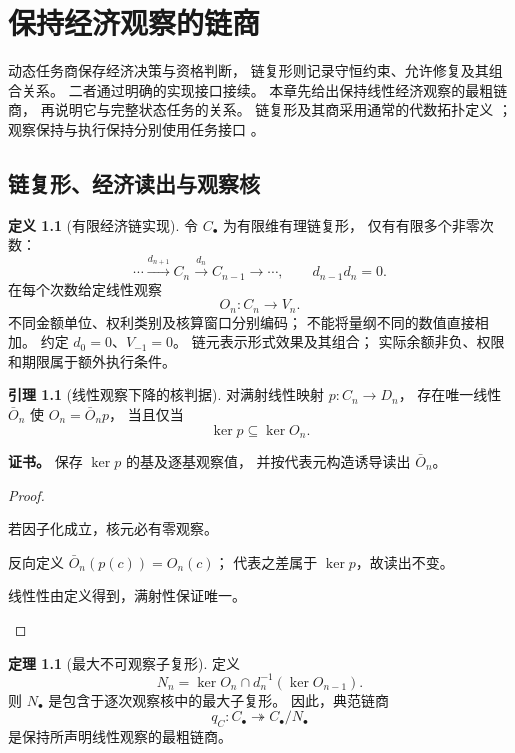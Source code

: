 \documentclass[UTF8,12pt,a4paper,openany,fontset=none,zihao=false]{ctexrep}
\theoremstyle{definition}
\newtheorem{definition}{定义}[chapter]
\newtheorem{theorem}{定理}[chapter]
\newtheorem{lemma}{引理}[chapter]
\newenvironment{certificate}{\par\noindent\textbf{证书。}\ignorespaces}{\par}
\newcommand{\1}{\mathbf 1}
\begin{document}
\chapter{保持经济观察的链商}
\label{ch:chapter}

动态任务商保存经济决策与资格判断，
链复形则记录守恒约束、允许修复及其组合关系。
二者通过明确的实现接口接续。
本章先给出保持线性经济观察的最粗链商，
再说明它与完整状态任务的关系。
链复形及其商采用通常的代数拓扑定义
\cite{Hatcher2002}；
观察保持与执行保持分别使用任务接口
\cite{InternalTheory,InternalEconomics}。
\section{链复形、经济读出与观察核}
\begin{definition}[有限经济链实现]
\label{ch:complex}
令 \(C_\bullet\) 为有限维有理链复形，
仅有有限多个非零次数：
\[
\cdots\xrightarrow{d_{n+1}}C_n
\xrightarrow{d_n}C_{n-1}\xrightarrow{}\cdots,
\qquad d_{n-1}d_n=0.
\]
在每个次数给定线性观察
\[
O_n:C_n\to V_n.
\]
不同金额单位、权利类别及核算窗口分别编码；
不能将量纲不同的数值直接相加。
约定 \(d_0=0\)、\(V_{-1}=0\)。
链元表示形式效果及其组合；
实际余额非负、权限和期限属于额外执行条件。
\end{definition}
\begin{lemma}[线性观察下降的核判据]
\label{ch:factor}
对满射线性映射 \(p:C_n\to D_n\)，
存在唯一线性 \(\bar O_n\) 使 \(O_n=\bar O_np\)，
当且仅当
\[
\ker p\subseteq\ker O_n.
\]
\end{lemma}
\begin{certificate}
保存 \(\ker p\) 的基及逐基观察值，
并按代表元构造诱导读出 \(\bar O_n\)。
\end{certificate}
\begin{proof}
\begin{semanticsteps}
\item 若因子化成立，核元必有零观察。
\item 反向定义 \(\bar O_n(p(c))=O_n(c)\)；
代表之差属于 \(\ker p\)，故读出不变。
\item 线性性由定义得到，满射性保证唯一。
\end{semanticsteps}
\end{proof}
\begin{theorem}[最大不可观察子复形]
\label{ch:maximal-kernel}
定义
\[
\boxed{
N_n=\ker O_n\cap d_n^{-1}(\ker O_{n-1}).
}
\]
则 \(N_\bullet\) 是包含于逐次观察核中的最大子复形。
因此，典范链商
\[
q_C:C_\bullet\twoheadrightarrow C_\bullet/N_\bullet
\]
是保持所声明线性观察的最粗链商。
\end{theorem}
\end{document}
